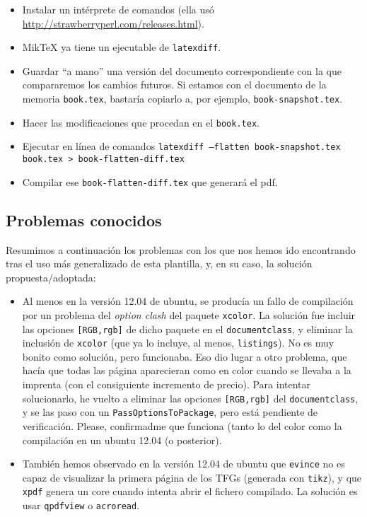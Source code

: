 \begin{itemize}
  \item Instalar un intérprete de comandos (ella usó \url{http://strawberryperl.com/releases.html}).
  
  \item MikTeX ya tiene un ejecutable de \texttt{latexdiff}.
  
  \item Guardar ``a mano'' una versión del documento correspondiente con la que compararemos los cambios futuros. Si estamos con el documento de la memoria \texttt{book.tex}, bastaría copiarlo a, por ejemplo, \texttt{book-snapshot.tex}.
  
  \item Hacer las modificaciones que procedan en el \texttt{book.tex}.
  
  \item Ejecutar en línea de comandos \texttt{latexdiff --flatten book-snapshot.tex book.tex > book-flatten-diff.tex}
  
  \item Compilar ese \texttt{book-flatten-diff.tex} que generará el pdf.
  
\end{itemize}

\subsection{Problemas conocidos}
\label{sec:problemas-conocidos}

Resumimos a continuación los problemas con los que nos hemos ido encontrando tras el uso más generalizado de esta plantilla, y, en su caso, la solución propuesta/adoptada:

\begin{itemize}

  \item Al menos en la versión 12.04 de ubuntu, se producía un fallo de compilación por un problema del \textit{option clash} del paquete \texttt{xcolor}. La solución fue incluir las opciones \texttt{[RGB,rgb]} de dicho paquete en el \texttt{documentclass}, y eliminar la inclusión de \texttt{xcolor} (que ya lo incluye, al menos, \texttt{listings}). No es muy bonito como solución, pero funcionaba. Eso dio lugar a otro problema, que hacía que todas las página aparecieran como en color cuando se llevaba a la imprenta (con el consiguiente incremento de precio). Para intentar solucionarlo, he vuelto a eliminar las opciones \texttt{[RGB,rgb]} del \texttt{documentclass}, y se las paso con un \texttt{PassOptionsToPackage}, pero está pendiente de verificación. Please, confirmadme que funciona (tanto lo del color como la compilación en un ubuntu 12.04 (o posterior).

  \item También hemos observado en la versión 12.04 de ubuntu que \texttt{evince} no es capaz de visualizar la primera página de los TFGs (generada con \texttt{tikz}), y que \texttt{xpdf} genera un core cuando intenta abrir el fichero compilado. La solución es usar \texttt{qpdfview} o \texttt{acroread}.

\end{itemize}

